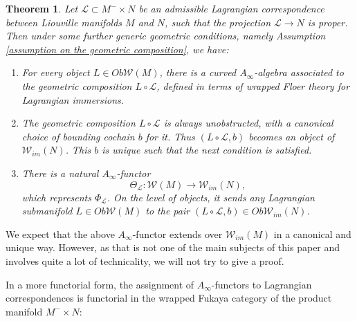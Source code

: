 \documentclass{amsart}
\newtheorem{theorem}{Theorem}[section]
\numberwithin{equation}{section}
\numberwithin{figure}{section}
\begin{document}
\begin{theorem}\label{functor associated to a Lagrangian correspondence}
	Let $\mathcal{L} \subset M^{-} \times N$ be an admissible Lagrangian correspondence between Liouville manifolds $M$ and $N$, such that the projection $\mathcal{L} \to N$ is proper. Then under some further generic geometric conditions, namely Assumption \ref{assumption on the geometric composition}, we have:
\begin{enumerate}[label=(\roman*)]

\item For every object $L \in Ob \mathcal{W}(M)$, there is a curved $A_{\infty}$-algebra associated to the geometric composition $L \circ \mathcal{L}$, defined in terms of wrapped Floer theory for Lagrangian immersions.

\item The geometric composition $L \circ \mathcal{L}$ is always unobstructed, with a canonical choice of bounding cochain $b$ for it. Thus $(L \circ \mathcal{L}, b)$ becomes an object of $\mathcal{W}_{im}(N)$. This $b$ is unique such that the next condition is satisfied.

\item There is a natural $A_{\infty}$-functor
\begin{equation}
\Theta_{\mathcal{L}}: \mathcal{W}(M) \to \mathcal{W}_{im}(N),
\end{equation}
which represents $\Phi_{\mathcal{L}}$. On the level of objects, it sends any Lagrangian submanifold $L \in Ob \mathcal{W}(M)$ to the pair $(L \circ \mathcal{L}, b) \in Ob \mathcal{W}_{im}(N)$.

\end{enumerate}

\end{theorem}

	We expect that the above $A_{\infty}$-functor extends over $\mathcal{W}_{im}(M)$ in a canonical and unique way. However, as that is not one of the main subjects of this paper and involves quite a lot of technicality, we will not try to give a proof. \par
	In a more functorial form, the assignment of $A_{\infty}$-functors to Lagrangian correspondences is functorial in the wrapped Fukaya category of the product manifold $M^{-} \times N$: \par
\end{document}

